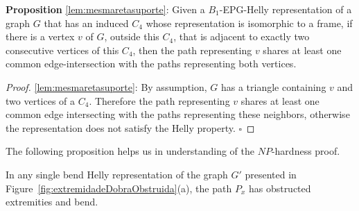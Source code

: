 \documentclass[runningheads]{llncs}
\begin{document}
\begin{pro*} \textbf{Proposition} \ref{lem:mesmaretasuporte}:
Given a $B_1$-EPG-Helly representation of a graph $G$ that has an induced $C_4$ whose representation is isomorphic to a frame, if there is a vertex $v$ of $G$, outside this $C_4$, that is adjacent to exactly two consecutive vertices of this $C_4$, then the path representing $v$ shares at least one common edge-intersection with the paths representing both vertices.%
\end{pro*}

\begin{proof} %
\ref{lem:mesmaretasuporte}:
By assumption, $G$ has a triangle containing $v$ and two vertices of a $C_4$. Therefore the path representing $v$ shares at least one common edge intersecting with the paths representing these neighbors, otherwise the representation does not satisfy the Helly property.
$\square$ \end{proof}

The following proposition helps us in understanding of the $NP$-hardness proof.


\begin{proposition}
In any single bend Helly representation of the graph $G'$ presented in Figure~\ref{fig:extremidadeDobraObstruida}(a), the path $P_{x}$ has obstructed extremities and bend.
\end{proposition}
\end{document}
